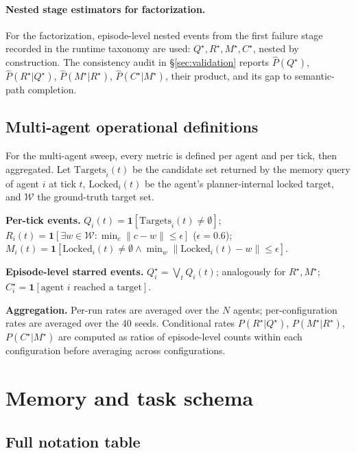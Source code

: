 \documentclass{article}
\begin{document}
\paragraph{Nested stage estimators for factorization.}
For the factorization, episode-level nested events from the first failure stage recorded in the runtime taxonomy are used: $Q^\star, R^\star, M^\star, C^\star$, nested by construction. The consistency audit in \S\ref{sec:validation} reports $\hat P(Q^\star)$, $\hat P(R^\star|Q^\star)$, $\hat P(M^\star|R^\star)$, $\hat P(C^\star|M^\star)$, their product, and its gap to semantic-path completion.

\subsection{Multi-agent operational definitions}
\label{app:multi-agent-defs}

For the multi-agent sweep, every metric is defined per agent and per tick, then aggregated. Let $\mathrm{Targets}_i(t)$ be the candidate set returned by the memory query of agent $i$ at tick $t$, $\mathrm{Locked}_i(t)$ be the agent's planner-internal locked target, and $\mathcal{W}$ the ground-truth target set.

\textbf{Per-tick events.} $Q_i(t) = \mathbf{1}[\mathrm{Targets}_i(t) \ne \emptyset]$; $R_i(t) = \mathbf{1}[\exists w \in \mathcal{W}: \min_{c}\|c - w\| \le \epsilon]$ ($\epsilon = 0.6$); $M_i(t) = \mathbf{1}[\mathrm{Locked}_i(t) \ne \emptyset \land \min_w\|\mathrm{Locked}_i(t) - w\| \le \epsilon]$.

\textbf{Episode-level starred events.} $Q^\star_i = \bigvee_t Q_i(t)$; analogously for $R^\star, M^\star$; $C^\star_i = \mathbf{1}[\text{agent } i \text{ reached a target}]$.

\textbf{Aggregation.} Per-run rates are averaged over the $N$ agents; per-configuration rates are averaged over the 40 seeds. Conditional rates $P(R^\star|Q^\star)$, $P(M^\star|R^\star)$, $P(C^\star|M^\star)$ are computed as ratios of episode-level counts within each configuration before averaging across configurations.

\section{Memory and task schema}
\label{app:schemas}

\subsection{Full notation table}
\label{app:notation}
\end{document}
